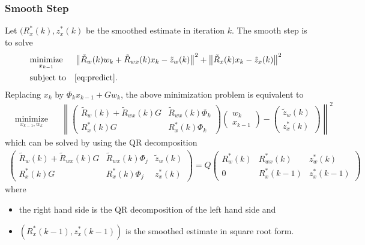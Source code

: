 \documentclass[microtype]{gtpart}     %
\theoremstyle{definition}
\newcommand{\norm}[1]{\left\lVert#1\right\rVert}
\begin{document}
\subsubsection{Smooth Step}

Let $(R^*_x(k), z^*_x(k)$ be the smoothed estimate in iteration $k$.
The smooth step is to solve
\begin{align*}
	& \underset{x_{k-1}}{\text{minimize}} & &\norm{\tilde{R}_w(k)w_k + \tilde{R}_{wx}(k)x_k - \tilde{z}_w(k)}^2 +
	\norm{\tilde{R}_x(k)x_k - \tilde{z}_x(k)}^2 \\
	& \text{subject to} & & \cref{eq:predict}.
\end{align*}
Replacing $x_k$ by $\Phi_k x_{k-1} + Gw_k$, the above minimization problem is equivalent to
\begin{align*}
	& \underset{x_{k-1}, w_k}{\text{minimize}} & &\norm{
		\begin{pmatrix}
			\tilde{R}_w(k) + \tilde{R}_{wx}(k)G &\tilde{R}_{wx}(k)\Phi_k \\
			R^*_x(k)G &R^*_x(k)\Phi_k
		\end{pmatrix}
		\begin{pmatrix}
		w_k \\ x_{k-1}
		\end{pmatrix} - 
		\begin{pmatrix}
			\tilde{z}_w(k) \\ z^*_x(k)
		\end{pmatrix}}^2
\end{align*}
which can be solved by using the QR decomposition
\begin{align*}
	\begin{pmatrix}
		\tilde{R}_w(k) + \tilde{R}_{wx}(k)G &\tilde{R}_{wx}(k)\Phi_j &\tilde{z}_w(k) \\
		R^*_x(k)G &R^*_x(k)\Phi_j &z^*_x(k)
	\end{pmatrix} = Q
	\begin{pmatrix}
		R^*_w(k) &R^*_{wx}(k) &z^*_w(k) \\
		0 &R^*_x(k-1) &z^*_x(k-1)
	\end{pmatrix}
\end{align*}
where
\begin{itemize}
	\item the right hand side is the QR decomposition of the left hand side and
	\item $(R^*_x(k-1), z^*_x(k-1))$ is the smoothed estimate in square root form.
\end{itemize}

%
%
%


%


\end{document}
